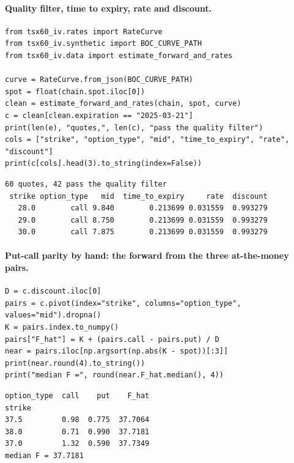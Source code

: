 \paragraph{Quality filter, time to expiry, rate and discount.}
{\footnotesize
\begin{verbatim}
from tsx60_iv.rates import RateCurve
from tsx60_iv.synthetic import BOC_CURVE_PATH
from tsx60_iv.data import estimate_forward_and_rates

curve = RateCurve.from_json(BOC_CURVE_PATH)
spot = float(chain.spot.iloc[0])
clean = estimate_forward_and_rates(chain, spot, curve)
c = clean[clean.expiration == "2025-03-21"]
print(len(e), "quotes,", len(c), "pass the quality filter")
cols = ["strike", "option_type", "mid", "time_to_expiry", "rate", "discount"]
print(c[cols].head(3).to_string(index=False))
\end{verbatim}
\vspace{-0.6em}
\begin{verbatim}
60 quotes, 42 pass the quality filter
 strike option_type   mid  time_to_expiry     rate  discount
   28.0        call 9.840        0.213699 0.031559  0.993279
   29.0        call 8.750        0.213699 0.031559  0.993279
   30.0        call 7.875        0.213699 0.031559  0.993279
\end{verbatim}
}

\paragraph{Put-call parity by hand: the forward from the three at-the-money pairs.}
{\footnotesize
\begin{verbatim}
D = c.discount.iloc[0]
pairs = c.pivot(index="strike", columns="option_type", values="mid").dropna()
K = pairs.index.to_numpy()
pairs["F_hat"] = K + (pairs.call - pairs.put) / D
near = pairs.iloc[np.argsort(np.abs(K - spot))[:3]]
print(near.round(4).to_string())
print("median F =", round(near.F_hat.median(), 4))
\end{verbatim}
\vspace{-0.6em}
\begin{verbatim}
option_type  call    put    F_hat
strike                           
37.5         0.98  0.775  37.7064
38.0         0.71  0.990  37.7181
37.0         1.32  0.590  37.7349
median F = 37.7181
\end{verbatim}
}

